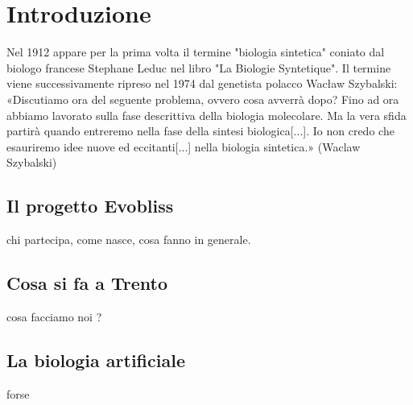 
\chapter{Introduzione}
\vspace{0.5cm}

\label{cha:intro}
Nel 1912 appare per la prima volta il termine "biologia sintetica" coniato dal biologo francese Stephane Leduc nel libro "La Biologie Syntetique". 
Il termine viene successivamente ripreso nel 1974 dal genetista polacco Wacław Szybalski:
\\ «Discutiamo ora del seguente problema, ovvero cosa avverrà dopo? Fino ad ora abbiamo lavorato sulla fase descrittiva della biologia molecolare. Ma la vera sfida partirà quando entreremo nella fase della sintesi biologica[...]. Io non credo che esauriremo idee nuove ed eccitanti[...] nella biologia sintetica.»
(Waclaw Szybalski) \cite{waclaw}


\section{Il progetto Evobliss}
\label{sec:context}
chi partecipa, come nasce, cosa fanno in generale.

\cite{ictbusiness}
\cite{donoho}


\section{Cosa si fa a Trento}
\label{sec:trento}
cosa facciamo noi ?


\section{La biologia artificiale}
\label{sec:artificial}
forse

